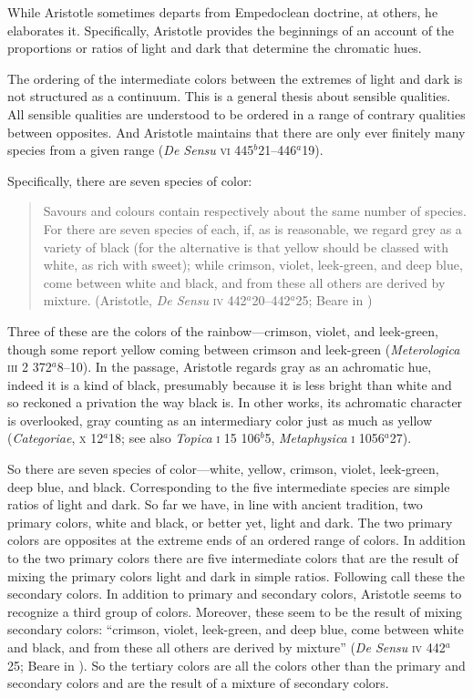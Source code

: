 While Aristotle sometimes departs from Empedoclean doctrine, at others, he elaborates it. Specifically, Aristotle provides the beginnings of an account of the proportions or ratios of light and dark that determine the chromatic hues.

The ordering of the intermediate colors between the extremes of light and dark is not structured as a continuum. This is a general thesis about sensible qualities. All sensible qualities are understood to be ordered in a range of contrary qualities between opposites. And Aristotle maintains that there are only ever finitely many species from a given range (\emph{De Sensu} \textsc{vi} 445\( ^{b} \)21--446\( ^{a} \)19). 

Specifically, there are seven species of color:
\begin{quote}
	Savours and colours contain respectively about the same number of species. For there are seven species of each, if, as is reasonable, we regard grey as a variety of black (for the alternative is that yellow should be classed with white, as rich with sweet); while crimson, violet, leek-green, and deep blue, come between white and black, and from these all others are derived by mixture. (Aristotle, \emph{De Sensu} \textsc{iv} 442\( ^{a} \)20--442\( ^{a} \)25; Beare in \citealt[12]{Barnes:1984uq})
\end{quote}
Three of these are the colors of the rainbow---crimson, violet, and leek-green, though some report yellow coming between crimson and leek-green (\emph{Meterologica} \textsc{iii} 2 372\( ^{a} \)8--10). In the passage, Aristotle regards gray as an achromatic hue, indeed it is a kind of black, presumably because it is less bright than white and so reckoned a privation the way black is. In other works, its achromatic character is overlooked, gray counting as an intermediary color just as much as yellow (\emph{Categoriae}, \textsc{x} 12\( ^{a} \)18; see also \emph{Topica} \textsc{i} 15 106\( ^{b} \)5, \emph{Metaphysica} \textsc{i} 1056\( ^{a} \)27).

So there are seven species of color---white, yellow, crimson, violet, leek-green, deep blue, and black. Corresponding to the five intermediate species are simple ratios of light and dark. So far we have, in line with ancient tradition, two primary colors, white and black, or better yet, light and dark. The two primary colors are opposites at the extreme ends of an ordered range of colors. In addition to the two primary colors there are five intermediate colors that are the result of mixing the primary colors light and dark in simple ratios. Following \citet[297]{Sorabji:2022qf} call these the secondary colors. In addition to primary and secondary colors, Aristotle seems to recognize a third group of colors. Moreover, these seem to be the result of mixing secondary colors: ``crimson, violet, leek-green, and deep blue, come between white and black, and from these all others are derived by mixture'' (\emph{De Sensu} \textsc{iv} 442\( ^{a} \)25; Beare in \citealt[12]{Barnes:1984uq}). So the tertiary colors are all the colors other than the primary and secondary colors and are the result of a mixture of secondary colors. 

